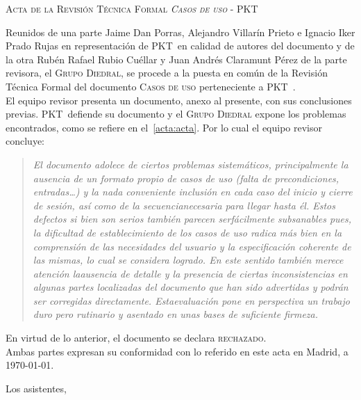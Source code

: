 \documentclass[11pt, a4paper, twoside]{article}
\newcommand*{\PKT}{P\lower2pt\hbox{K}\kern-2pt\raise2pt\hbox{T}\kern-2pt}
\begin{document}
	\begin{center}
		\scshape \large Acta de la Revisión Técnica Formal \textit{Casos de uso} - \PKT\ \vspace{.5cm}
	\end{center}

	Reunidos de una parte Jaime Dan Porras, Alejandro Villarín Prieto e Ignacio Iker Prado Rujas en representación de \PKT\ en calidad de autores del documento y de la otra Rubén Rafael Rubio Cuéllar y Juan Andrés Claramunt Pérez de la parte revisora, el \textsc{Grupo Diedral}, se procede a la puesta en común de la Revisión Técnica Formal del documento \textsc{Casos de uso} perteneciente a \PKT\ . \\

	El equipo revisor presenta un documento, anexo al presente, con sus conclusiones previas. \PKT\ defiende su documento y el \textsc{Grupo Diedral} expone los problemas encontrados, como se refiere en el~\ref{acta:acta}. Por lo cual el equipo revisor concluye:

\begin{quotation} \itshape
	El documento adolece de ciertos problemas sistemáticos, principalmente la ausencia de un formato propio de casos de uso (falta de precondiciones, entradas\ldots) y la nada conveniente inclusión en cada caso del inicio y cierre de sesión, así como de la secuencia\break necesaria para llegar hasta él. Estos defectos si bien son serios también parecen ser\break fácilmente subsanables pues, la dificultad de establecimiento de los casos de uso radica más bien en la comprensión de las necesidades del usuario y la especificación coherente de las mismas, lo cual se considera logrado. En este sentido también merece atención la\break ausencia de detalle y la presencia de ciertas inconsistencias en algunas partes \mbox{localizadas} del documento que han sido advertidas y podrán ser corregidas directamente. Esta\break evaluación pone en perspectiva un trabajo duro pero rutinario y asentado en unas bases de suficiente firmeza.
\end{quotation}


\noindent
En virtud de lo anterior, el documento se declara \textsc{rechazado}.\\

	Ambas partes expresan su conformidad con lo referido en este acta en Madrid, a \today.

\begin{flushleft}
	Los asistentes,
\end{flushleft}
\end{document}
